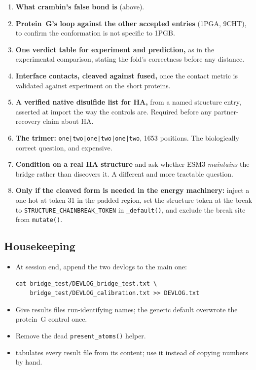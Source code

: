 \documentclass[11pt,a4paper]{article}
\begin{document}
\begin{enumerate}
\item \textbf{What crambin's false bond is} (above).
\item \textbf{Protein~G's loop against the other accepted entries} (1PGA, 9CHT),
  to confirm the conformation is not specific to 1PGB.
\item \textbf{One verdict table for experiment and prediction,} as in the
  experimental comparison, stating the fold's correctness before any distance.
\item \textbf{Interface contacts, cleaved against fused,} once the contact
  metric is validated against experiment on the short proteins.
\item \textbf{A verified native disulfide list for HA,} from a named
  structure entry, asserted at import the way the controls are. Required
  before any partner-recovery claim about HA.
\item \textbf{The trimer:} \texttt{one|two|one|two|one|two}, 1653 positions.
  The biologically correct question, and expensive.
\item \textbf{Condition on a real HA structure} and ask whether ESM3
  \emph{maintains} the bridge rather than discovers it. A different and more
  tractable question.
\item \textbf{Only if the cleaved form is needed in the energy machinery:}
  inject a one-hot at token 31 in the padded region, set the structure token
  at the break to \texttt{STRUCTURE\_CHAINBREAK\_TOKEN} in
  \texttt{\_default()}, and exclude the break site from \texttt{mutate()}.
\end{enumerate}

\subsection{Housekeeping}

\begin{itemize}
\item At session end, append the two devlogs to the main one:
\begin{verbatim}
cat bridge_test/DEVLOG_bridge_test.txt \
    bridge_test/DEVLOG_calibration.txt >> DEVLOG.txt
\end{verbatim}
\item Give results files run-identifying names; the generic default
  overwrote the protein~G control once.
\item Remove the dead \texttt{present\_atoms()} helper.
\item {} tabulates every result file from
  its content; use it instead of copying numbers by hand.
\end{itemize}
\end{document}
